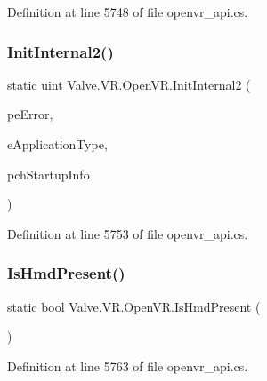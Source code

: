Definition at line 5748 of file openvr\+\_\+api.\+cs.

\mbox{\label{class_valve_1_1_v_r_1_1_open_v_r_addca6efca3552cea11254bf061387e77}} 
\subsubsection{\texorpdfstring{InitInternal2()}{InitInternal2()}}
{\footnotesize\ttfamily static uint Valve.\+V\+R.\+Open\+V\+R.\+Init\+Internal2 (\begin{DoxyParamCaption}\item[{ref \mbox{\hyperlink{namespace_valve_1_1_v_r_a5d8a20b60549ae5b7668d73452c7e83e}{E\+V\+R\+Init\+Error}}}]{pe\+Error,  }\item[{\mbox{\hyperlink{namespace_valve_1_1_v_r_a75c95b1b332a3c064198f2eac92ffe07}{E\+V\+R\+Application\+Type}}}]{e\+Application\+Type,  }\item[{string}]{pch\+Startup\+Info }\end{DoxyParamCaption})\hspace{0.3cm}{\ttfamily [static]}}



Definition at line 5753 of file openvr\+\_\+api.\+cs.

\mbox{\label{class_valve_1_1_v_r_1_1_open_v_r_a3586c9cb26b462671a12958e442ba58a}} 
\subsubsection{\texorpdfstring{IsHmdPresent()}{IsHmdPresent()}}
{\footnotesize\ttfamily static bool Valve.\+V\+R.\+Open\+V\+R.\+Is\+Hmd\+Present (\begin{DoxyParamCaption}{ }\end{DoxyParamCaption})\hspace{0.3cm}{\ttfamily [static]}}



Definition at line 5763 of file openvr\+\_\+api.\+cs.

\mbox{\label{class_valve_1_1_v_r_1_1_open_v_r_ab0838779108201f20567fb3bf8d8050d}} 
